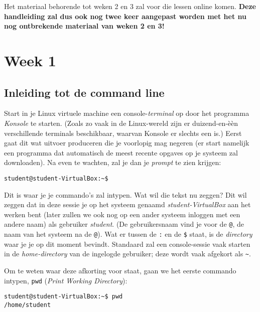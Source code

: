 \documentclass[a4paper,twoside,openany]{memoir}
\begin{document}
Het materiaal behorende tot weken 2 en 3 zal voor die lessen online komen. \textbf{Deze handleiding zal dus ook nog twee keer aangepast worden met het nu nog ontbrekende materiaal van weken 2 en 3!}

\part{Week 1}
\chapter{Inleiding tot de command line}

Start in je Linux virtuele machine een console-\emph{terminal} op door het programma \emph{Konsole} te starten. (Zoals zo vaak in de Linux-wereld zijn er duizend-en-\`e\`en verschillende terminals beschikbaar, waarvan Konsole er slechts een is.) Eerst gaat dit wat uitvoer produceren die je voorlopig mag negeren (er start namelijk een programma dat automatisch de meest recente opgaves op je systeem zal downloaden). Na even te wachten, zal je dan je \emph{prompt} te zien krijgen:

\begin{verbatim}
student@student-VirtualBox:~$ 
\end{verbatim}

Dit is waar je je commando's zal intypen. Wat wil die tekst nu zeggen? Dit wil zeggen dat in deze sessie je op het systeem genaamd \emph{student-VirtualBox} aan het werken bent (later zullen we ook nog op een ander systeem inloggen met een andere naam) als gebruiker \emph{student}. (De gebruikersnaam vind je voor de \texttt{@}, de naam van het systeem na de \texttt{@}). Wat er tussen de \texttt{:} en de \texttt{\$} staat, is de \emph{directory} waar je je op dit moment bevindt. Standaard zal een console-sessie vaak starten in de \emph{home-directory} van de ingelogde gebruiker; deze wordt vaak afgekort als \texttt{\~}.

Om te weten waar deze afkorting voor staat, gaan we het eerste commando intypen, \verb!pwd! (\emph{Print Working Directory}):
\begin{verbatim}
student@student-VirtualBox:~$ pwd
/home/student
\end{verbatim}
\end{document}
